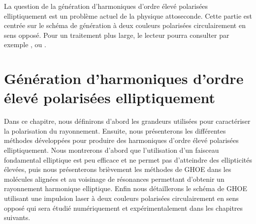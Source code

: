 La question de la génération d'harmoniques d'ordre élevé polarisées elliptiquement est un problème actuel de la physique attoseconde. Cette partie est centrée sur le schéma de génération à deux couleurs polarisées circulairement en sens opposé. Pour un traitement plus large, le lecteur pourra consulter par exemple , ou .

\chapter{Génération d'harmoniques d'ordre élevé polarisées elliptiquement}
\label{chap:GHOE_elliptiques}
Dans ce chapitre, nous définirons d'abord les grandeurs utilisées pour caractériser la polarisation du rayonnement. Ensuite, nous présenterons les différentes méthodes développées pour produire des harmoniques d'ordre élevé polarisées elliptiquement. Nous montrerons d'abord que l'utilisation d'un faisceau fondamental elliptique est peu efficace et ne permet pas d'atteindre des ellipticités élevées, puis nous présenterons brièvement les méthodes de GHOE dans les molécules alignées et au voisinage de résonances permettant d'obtenir un rayonnement harmonique elliptique. Enfin nous détaillerons le schéma de GHOE utilisant une impulsion laser à deux couleurs polarisées circulairement en sens opposé qui sera étudié numériquement et expérimentalement dans les chapitres suivants. 

